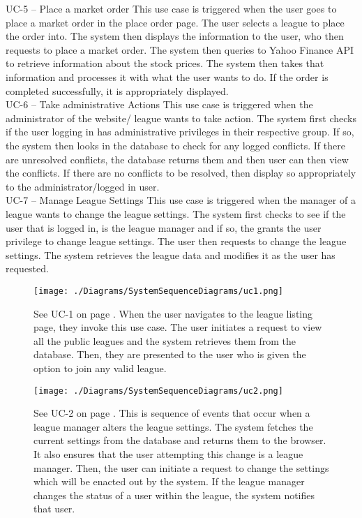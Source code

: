 UC-5 – Place a market order
This use case is triggered when the user goes to place a market order in the place
order page. The user selects a league to place the order into. The system then
displays the information to the user, who then requests to place a market order.
The system then queries to Yahoo Finance API to retrieve information about the
stock prices. The system then takes that information and processes it with what
the user wants to do. If the order is completed successfully, it is appropriately
displayed.\\

UC-6 – Take administrative Actions
This use case is triggered when the administrator of the website/ league wants
to take action. The system first checks if the user logging in has administrative
privileges in their respective group. If so, the system then looks in the database
to check for any logged conflicts. If there are unresolved conflicts, the database
returns them and then user can then view the conflicts. If there are no conflicts to
be resolved, then display so appropriately to the administrator/logged in user.\\

UC-7 – Manage League Settings
This use case is triggered when the manager of a league wants to change the league
settings. The system first checks to see if the user that is logged in, is the league
manager and if so, the grants the user privilege to change league settings. The user
then requests to change the league settings. The system retrieves the league data
and modifies it as the user has requested.\\



\iffalse
\begin{figure}
\centering
\texttt{[image: ./Diagrams/SystemSequenceDiagrams/uc1.png]}
\caption{See UC-1 on page \pageref{UC-1}. When the user navigates to the league listing page, they invoke this use case. The user initiates a request to view all the public leagues and the system retrieves them from the database. Then, they are presented to the user who is given the option to join any valid league.}
\end{figure}

\begin{figure}
\centering
\texttt{[image: ./Diagrams/SystemSequenceDiagrams/uc2.png]}
\caption{See UC-2 on page \pageref{UC-2}. This is sequence of events that occur when a league manager alters the league settings. The system fetches the current settings from the database and returns them to the browser. It also ensures that the user attempting this change is a league manager. Then, the user can initiate a request to change the settings which will be enacted out by the system. If the league manager changes the status of a user within the league, the system notifies that user.}
\end{figure}

